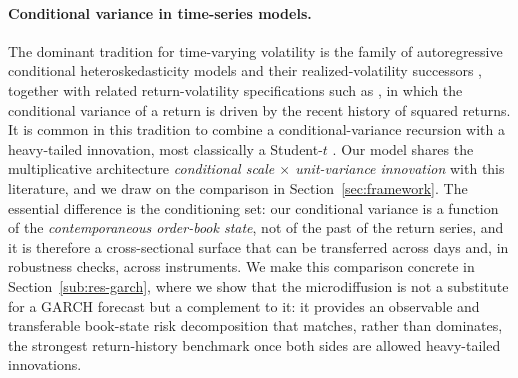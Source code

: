 \documentclass[11pt]{article}
\theoremstyle{plain}
\theoremstyle{definition}
\begin{document}
\paragraph{Conditional variance in time-series models.}
The dominant tradition for time-varying volatility is the family of autoregressive
conditional heteroskedasticity models \citep{engle1982,bollerslev1986} and their
realized-volatility successors \citep{andersen2003}, together with related
return-volatility specifications such as \citet{ma2014model}, in which the conditional
variance of a return is driven by the recent history of squared returns. It is
common in this tradition to combine a conditional-variance recursion with a
heavy-tailed innovation, most classically a Student-$t$ \citep{bollerslev1987}. Our
model shares the multiplicative architecture \emph{conditional scale $\times$
unit-variance innovation} with this literature, and we draw on the comparison in
Section~\ref{sec:framework}. The essential difference is the conditioning set: our
conditional variance is a function of the \emph{contemporaneous order-book state},
not of the past of the return series, and it is therefore a cross-sectional surface
that can be transferred across days and, in robustness checks, across instruments. We
make this comparison concrete in Section~\ref{sub:res-garch}, where we show that the
microdiffusion is not a substitute for a GARCH forecast but a complement to it:
it provides an observable and transferable book-state risk decomposition that matches,
rather than dominates, the strongest return-history benchmark once both sides are allowed
heavy-tailed innovations.
\end{document}
